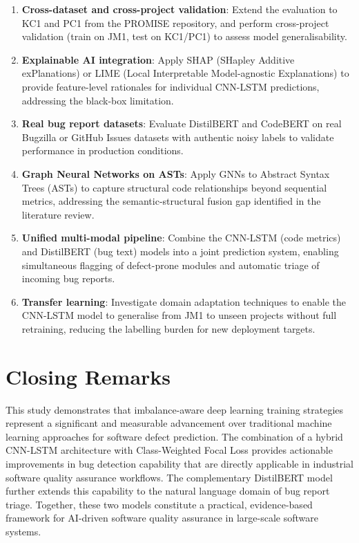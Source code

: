 \documentclass[12pt,a4paper,oneside]{report}
\begin{document}
\begin{enumerate}
  \item \textbf{Cross-dataset and cross-project validation}: Extend the evaluation to KC1 and PC1 from the PROMISE repository, and perform cross-project validation (train on JM1, test on KC1/PC1) to assess model generalisability.

  \item \textbf{Explainable AI integration}: Apply SHAP (SHapley Additive exPlanations) or LIME (Local Interpretable Model-agnostic Explanations) to provide feature-level rationales for individual CNN-LSTM predictions, addressing the black-box limitation.

  \item \textbf{Real bug report datasets}: Evaluate DistilBERT and CodeBERT on real Bugzilla or GitHub Issues datasets with authentic noisy labels to validate performance in production conditions.

  \item \textbf{Graph Neural Networks on ASTs}: Apply GNNs to Abstract Syntax Trees (ASTs) to capture structural code relationships beyond sequential metrics, addressing the semantic-structural fusion gap identified in the literature review.

  \item \textbf{Unified multi-modal pipeline}: Combine the CNN-LSTM (code metrics) and DistilBERT (bug text) models into a joint prediction system, enabling simultaneous flagging of defect-prone modules and automatic triage of incoming bug reports.

  \item \textbf{Transfer learning}: Investigate domain adaptation techniques to enable the CNN-LSTM model to generalise from JM1 to unseen projects without full retraining, reducing the labelling burden for new deployment targets.
\end{enumerate}

\section{Closing Remarks}

This study demonstrates that imbalance-aware deep learning training strategies represent a significant and measurable advancement over traditional machine learning approaches for software defect prediction. The combination of a hybrid CNN-LSTM architecture with Class-Weighted Focal Loss provides actionable improvements in bug detection capability that are directly applicable in industrial software quality assurance workflows. The complementary DistilBERT model further extends this capability to the natural language domain of bug report triage. Together, these two models constitute a practical, evidence-based framework for AI-driven software quality assurance in large-scale software systems.
\end{document}
